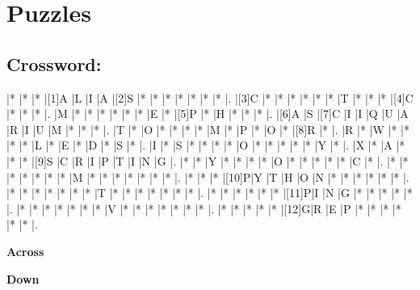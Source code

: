 \documentclass{article}
\begin{document}
\section*{Puzzles}

\subsection*{Crossword:}

\begin{Puzzle}{15}{15} %
|*    |*    |*    |[1]A |L    |I    |A    |[2]S |*    |*    |*    |*    |*    |*    |*    |.
|[3]C |*    |*    |*    |*    |*    |*    |T    |*    |*    |*    |[4]C |*    |*    |*    |.
|M    |*    |*    |*    |*    |*    |*    |E    |*    |[5]P |*    |H    |*    |*    |*    |.
|[6]A |S    |[7]C |I    |I    |Q    |U    |A    |R    |I    |U    |M    |*    |*    |*    |.
|T    |*    |O    |*    |*    |*    |*    |M    |*    |P    |*    |O    |*    |[8]R |*    |.
|R    |*    |W    |*    |*    |*    |*    |L    |*    |E    |*    |D    |*    |S    |*    |.
|I    |*    |S    |*    |*    |*    |*    |O    |*    |*    |*    |*    |*    |Y    |*    |.
|X    |*    |A    |*    |*    |*    |[9]S |C    |R    |I    |P    |T    |I    |N    |G    |.
|*    |*    |Y    |*    |*    |*    |*    |O    |*    |*    |*    |*    |*    |C    |*    |.
|*    |*    |*    |*    |*    |*    |*    |M    |*    |*    |*    |*    |*    |*    |*    |.
|*    |*    |*    |[10]P|Y    |T    |H    |O    |N    |*    |*    |*    |*    |*    |*    |.
|*    |*    |*    |*    |*    |*    |*    |T    |*    |*    |*    |*    |*    |*    |*    |.
|*    |*    |*    |*    |*    |*    |[11]P|I    |N    |G    |*    |*    |*    |*    |*    |.
|*    |*    |*    |*    |*    |*    |*    |V    |*    |*    |*    |*    |*    |*    |*    |.
|*    |*    |*    |*    |*    |[12]G|R    |E    |P    |*    |*    |*    |*    |*    |*    |.
\end{Puzzle}


\begin{PuzzleClues}{\textbf{Across}} %
\end{PuzzleClues} %
%
\begin{PuzzleClues}{\textbf{Down}}
\end{PuzzleClues}
\end{document}
